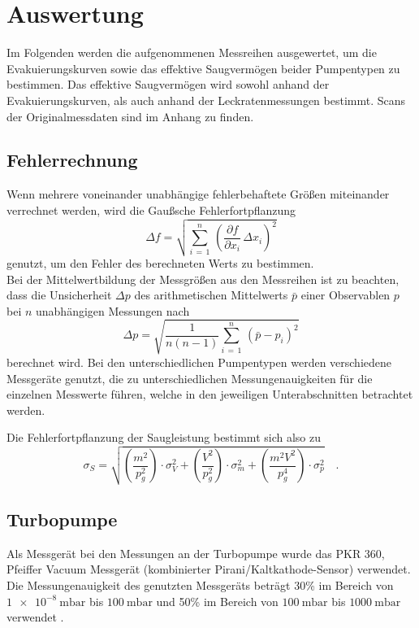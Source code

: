 \section{Auswertung}
\label{sec:Auswertung}

Im Folgenden werden die aufgenommenen Messreihen ausgewertet, um die Evakuierungskurven sowie das effektive Saugvermögen beider Pumpentypen zu bestimmen. Das effektive Saugvermögen wird sowohl anhand der Evakuierungskurven, als auch anhand der Leckratenmessungen bestimmt. Scans der Originalmessdaten sind im Anhang zu finden.

\subsection{Fehlerrechnung}
\noindent
Wenn mehrere voneinander unabhängige fehlerbehaftete Größen miteinander verrechnet werden, wird die Gaußsche Fehlerfortpflanzung
\begin{equation}
\Delta f = \sqrt{\sum_{i \, = \, 1}^{n} \, \left(\frac{\partial f}{\partial x_i} \, \Delta x_i\right)^2}
\label{eq:ffp}
\end{equation}
genutzt, um den Fehler des berechneten Werts zu bestimmen.\\
Bei der Mittelwertbildung der Messgrößen aus den Messreihen ist zu beachten, dass die Unsicherheit $\Delta p$ des arithmetischen Mittelwerts $\bar{p}$ einer Observablen $p$ bei $n$ unabhängigen Messungen nach
\begin{equation}
\Delta p =  \sqrt{\frac{1}{n(n-1)} \sum_{i \, = \, 1}^{n} \, \left(\bar{p}- p_i\right)^2}
\label{eq:mittel}
\end{equation}
berechnet wird. Bei den unterschiedlichen Pumpentypen werden verschiedene Messgeräte genutzt, die zu unterschiedlichen Messungenauigkeiten für die einzelnen Messwerte führen, welche in den jeweiligen Unterabschnitten betrachtet werden.

\noindent
Die Fehlerfortpflanzung der Saugleistung bestimmt sich also zu
\begin{equation*}
  \sigma_{S} = \sqrt{\left(\frac{m^2}{p_g^2}\right) \cdot \sigma_{V}^2 + \left(\frac{V^2}{p_g^2}\right) \cdot \sigma_m^2 + \left(\frac{m^2 V^2}{p_g^4}\right) \cdot \sigma_p^2} \quad .
\end{equation*}


\subsection{Turbopumpe}
Als Messgerät bei den Messungen an der Turbopumpe wurde das PKR 360, Pfeiffer Vacuum Messgerät (kombinierter Pirani/Kaltkathode-Sensor) verwendet. Die Messungenauigkeit des genutzten Messgeräts beträgt 30\% im Bereich von  $\SI{1e-8}{\milli\bar}$ bis $\SI{100}{\milli\bar}$ und 50\% im Bereich von $\SI{100}{\milli\bar}$ bis $\SI{1000}{\milli\bar}$ verwendet \cite{V70}.


